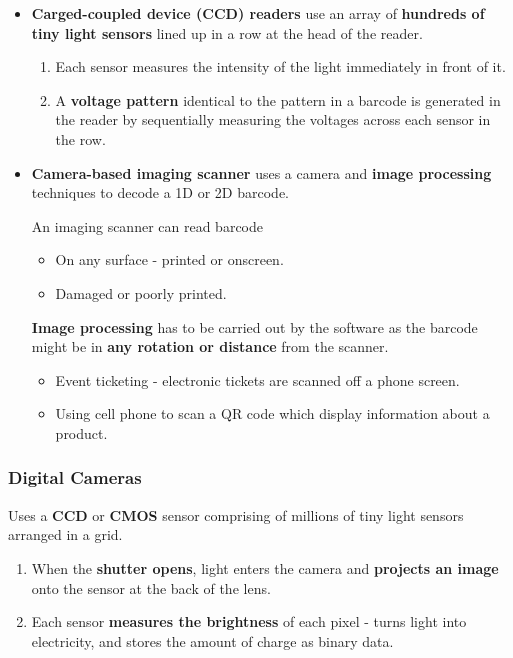 \begin{itemize}
    \item \textbf{Carged-coupled device (CCD) readers} use an array of \textbf{hundreds of tiny light sensors} lined up in a row at the head of the reader.
        \begin{enumerate}
            \item Each sensor measures the intensity of the light immediately in front of it.
            \item A \textbf{voltage pattern} identical to the pattern in a barcode is generated in the reader by sequentially measuring the voltages across each sensor in the row.
        \end{enumerate}

    \item \textbf{Camera-based imaging scanner} uses a camera and \textbf{image processing} techniques to decode a 1D or 2D barcode.

        An imaging scanner can read barcode
        \begin{itemize}
            \item On any surface - printed or onscreen.
            \item Damaged or poorly printed.
        \end{itemize}

        \textbf{Image processing} has to be carried out by the software as the barcode might be in \textbf{any rotation or distance} from the scanner.
        \begin{itemize}
            \item Event ticketing - electronic tickets are scanned off a phone screen.
            \item Using cell phone to scan a QR code which display information about a product.
        \end{itemize}
\end{itemize}

\subsubsection*{Digital Cameras}

Uses a \textbf{CCD} or \textbf{CMOS} sensor comprising of millions of tiny light sensors arranged in a grid.
\begin{enumerate}
    \item When the \textbf{shutter opens}, light enters the camera and \textbf{projects an image} onto the sensor at the back of the lens.
    \item Each sensor \textbf{measures the brightness} of each pixel - turns light into electricity, and stores the amount of charge as binary data.
\end{enumerate}

